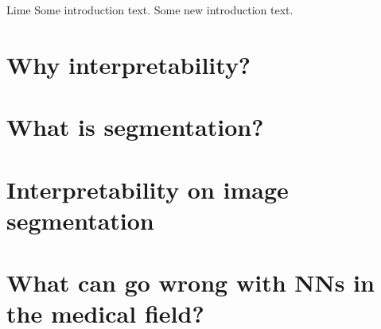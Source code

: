 Lime \cite{ribeiro2016should}
Some introduction text.
Some new introduction text.

\section{Why interpretability?}
\section{What is segmentation?}
\section{Interpretability on image segmentation}
\section{What can go wrong with NNs in the medical field?}
